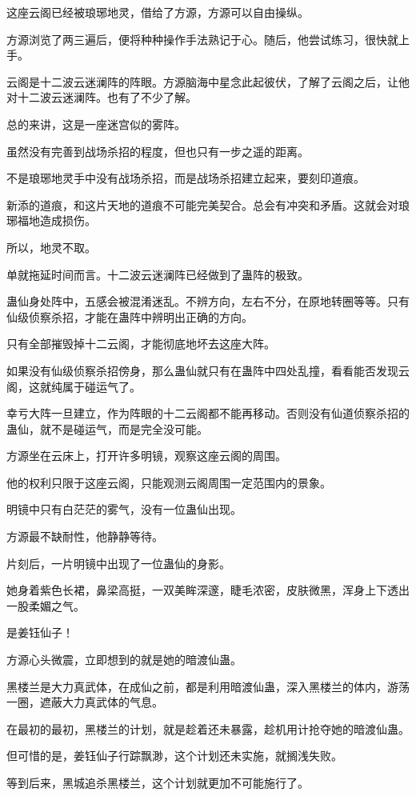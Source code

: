 \begin{this_body}
这座云阁已经被琅琊地灵，借给了方源，方源可以自由操纵。

方源浏览了两三遍后，便将种种操作手法熟记于心。随后，他尝试练习，很快就上手。

云阁是十二波云迷澜阵的阵眼。方源脑海中星念此起彼伏，了解了云阁之后，让他对十二波云迷澜阵。也有了不少了解。

总的来讲，这是一座迷宫似的雾阵。

虽然没有完善到战场杀招的程度，但也只有一步之遥的距离。

不是琅琊地灵手中没有战场杀招，而是战场杀招建立起来，要刻印道痕。

新添的道痕，和这片天地的道痕不可能完美契合。总会有冲突和矛盾。这就会对琅琊福地造成损伤。

所以，地灵不取。

单就拖延时间而言。十二波云迷澜阵已经做到了蛊阵的极致。

蛊仙身处阵中，五感会被混淆迷乱。不辨方向，左右不分，在原地转圈等等。只有仙级侦察杀招，才能在蛊阵中辨明出正确的方向。

只有全部摧毁掉十二云阁，才能彻底地坏去这座大阵。

如果没有仙级侦察杀招傍身，那么蛊仙就只有在蛊阵中四处乱撞，看看能否发现云阁，这就纯属于碰运气了。

幸亏大阵一旦建立，作为阵眼的十二云阁都不能再移动。否则没有仙道侦察杀招的蛊仙，就不是碰运气，而是完全没可能。

方源坐在云床上，打开许多明镜，观察这座云阁的周围。

他的权利只限于这座云阁，只能观测云阁周围一定范围内的景象。

明镜中只有白茫茫的雾气，没有一位蛊仙出现。

方源最不缺耐性，他静静等待。

片刻后，一片明镜中出现了一位蛊仙的身影。

她身着紫色长裙，鼻梁高挺，一双美眸深邃，睫毛浓密，皮肤微黑，浑身上下透出一股柔媚之气。

是姜钰仙子！

方源心头微震，立即想到的就是她的暗渡仙蛊。

黑楼兰是大力真武体，在成仙之前，都是利用暗渡仙蛊，深入黑楼兰的体内，游荡一圈，遮蔽大力真武体的气息。

在最初的最初，黑楼兰的计划，就是趁着还未暴露，趁机用计抢夺她的暗渡仙蛊。

但可惜的是，姜钰仙子行踪飘渺，这个计划还未实施，就搁浅失败。

等到后来，黑城追杀黑楼兰，这个计划就更加不可能施行了。


\end{this_body}
